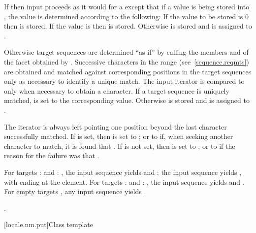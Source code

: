 \begin{itemdescr}
\pnum
\effects
If 
then input proceeds as it would for a 
except that if a value is being stored into ,
the value is determined according to the following:
If the value to be stored is 0 then  is stored.
If the value is  then  is stored.
Otherwise  is stored and
 is assigned to .

\pnum
Otherwise target sequences are determined ``as if'' by
calling the members  and  of
the facet obtained by .
Successive characters in the range  (see~\ref{sequence.reqmts})
are obtained and matched against
corresponding positions in the target sequences
only as necessary to identify a unique match.
The input iterator  is compared to 
only when necessary to obtain a character.
If a target sequence is uniquely matched,
 is set to the corresponding value.
Otherwise  is stored and
 is assigned to .

\pnum
The  iterator is always left pointing one position beyond
the last character successfully matched.
If  is set, then  is set to ;
or to  if,
when seeking another character to match,
it is found that .
If  is not set, then  is set to ;
or to 
if the reason for the failure was that .
\begin{example}
For targets :  and : ,
the input sequence  yields
 and ;
the input sequence  yields
, with  ending at the  element.
For targets :  and : ,
the input sequence  yields
 and .
For empty targets ,
any input sequence yields .
\end{example}

\pnum
\returns
{}.
\end{itemdescr}

[locale.nm.put]{Class template }

